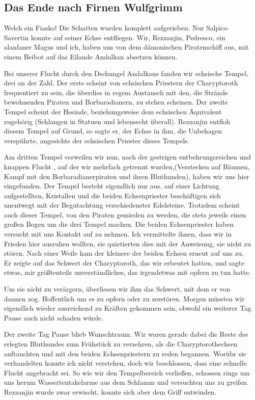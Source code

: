 \subsection{Das Ende nach Firnen Wulfgrimm}

Welch ein Fiasko! Die Schatten wurden komplett aufgerieben. Nur Salpico Savertin konnte auf seiner Echse entfliegen. Wir, Rezzanjin, Pedresco, ein alanfaner Magus und ich, haben uns von dem dämonischen Piratenschiff aus, mit einem Beibot auf das Eilande Andalkan absetzen können.

Bei unserer Flucht durch den Dschungel Andalkans fanden wir echsische Tempel, drei an der Zahl. Der erste scheint von echsischen Priestern der Charyptoroth frequentiert zu sein, die überdies in regem Austausch mit den, die Strände bewohnenden Piraten und Borbaradianern, zu stehen scheinen. Der zweite Tempel scheint der Hesinde, beziehungsweise dem echsischen Äquivalent zugehörig (Schlangen in Statuen und lebensecht überall). Rezzanjin entfloh diesem Tempel auf Grund, so sagte er, der Echse in ihm, die Unbehagen verspührte, angesichts der echsischen Priester dieses Tempels.

Am dritten Tempel verweilen wir nun, nach der gestrigen entbehrungsreichen und knappen Flucht , auf der wir mehrfach getrennt wurden,(Verstecken auf Bäumen, Kampf mit den Borbaradianerpiraten und ihren Bluthunden), haben wir uns hier eingefunden. Der Tempel besteht eigendlich nur aus, auf einer Lichtung aufgestellten, Kristallen und die beiden Echsenpriester beschäftigen sich unentwegt mit der Begutachtung verschiedenster Edelsteine. Trotzdem scheint auch dieser Tempel, von den Piraten gemieden zu werden, die stets jeweils einen großen Bogen um die drei Tempel machen. Die beiden Echsenpriester haben versucht mit uns Kontakt auf zu nehmen. Ich vermittelte ihnen, dass wir in Frieden hier ausruhen wollten, sie quietierten dies mit der Anweisung, sie nicht zu stören. Nach einer Weile kam der kleinere der beiden Echsen erneut auf uns zu. Er zeigte auf das Schwert der Charyptoroth, das wir erbeutet hatten, und sagte etwas, mir größtenteils unverständliches, das irgendetwas mit opfern zu tun hatte.

Um sie nicht zu verärgern, überliesen wir ihm das Schwert, mit dem er von dannen zog. Hoffentlich um es zu opfern oder zu zerstören. Morgen müssten wir eigendlich wieder ausreichend zu Kräften gekommen sein, obwohl ein weiterer Tag Pause auch nicht schaden würde.

Der zweite Tag Pause blieb Wunschtraum. Wir waren gerade dabei die Reste des erlegten Bluthundes zum Frühstück zu verzehren, als die Charyptorothechsen auftauchten und mit den beiden Echsenpriestern zu reden begannen. Worübr sie verhandelten konnte ich nicht verstehen, doch wir beschlossen, dass eine schnelle Flucht angebracht sei. So wie wir den Tempelbereich verließen, schossen rings um uns herum Wassertentakelarme aus dem Schlamm und versuchten uns zu greifen. Rezzanjin wurde zwar erwischt, konnte sich aber dem Griff entwinden.

